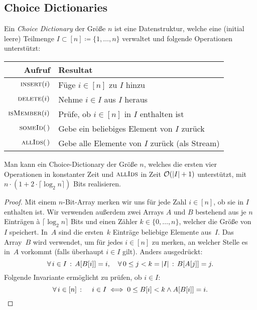 \documentclass{cheat-sheet}
\newcommand{\ceil}[1]{\lceil #1 \rceil} %
\renewcommand{\O}{\mathcal{O}} %
\begin{document}
\subsection{Choice Dictionaries}

\begin{defn}
  Ein \emph{Choice Dictionary} der Größe $n$ ist eine Datenstruktur, welche eine (initial leere) Teilmenge $I \subset [n] \coloneqq \{ 1, \ldots, n \}$ verwaltet und folgende Operationen unterstützt:
  
  \begin{tabular}{r l}
    Aufruf & Resultat \\[3pt] \hline
    $\Call{insert}{i}$ & Füge $i \in [n]$ zu $I$ hinzu \\
    $\Call{delete}{i}$ & Nehme $i \in I$ aus $I$ heraus \\
    $\Call{isMember}{i}$ & Prüfe, ob $i \in [n]$ in $I$ enthalten ist \\
    $\Call{someId}{\,}$ & Gebe ein beliebiges Element von $I$ zurück \\
    $\Call{allIds}{\,}$ & Gebe alle Elemente von $I$ zurück (als Stream)
  \end{tabular}
\end{defn}

\begin{lem}[CD\textsubscript{1}]
  Man kann ein Choice-Dictionary der Größe $n$, welches die ersten vier Operationen in konstanter Zeit und $\Call{allIds}{}$ in Zeit $\O(\abs{I} + 1)$ unterstützt, mit $n \cdot (1 + 2 \cdot \ceil{\log_2 n})$ Bits realisieren.
\end{lem}

\begin{proof}
  Mit einem $n$-Bit-Array merken wir uns für jede Zahl $i \in [n]$, ob sie in $I$ enthalten ist.
  Wir verwenden außerdem zwei Arrays $A$ und $B$ bestehend aus je $n$ Einträgen à $\ceil{\log_2 n}$ Bits und einen Zähler $k \in \{ 0, \ldots, n \}$, welcher die Größe von~$I$ speichert.
  In~$A$ sind die ersten~$k$ Einträge beliebige Elemente aus~$I$.
  Das Array~$B$ wird verwendet, um für jedes $i \in [n]$ zu merken, an welcher Stelle es in~$A$ vorkommt (falls überhaupt $i \in I$ gilt).
  Anders ausgedrückt:
  \[
    \forall \, {i \in I} \,:\, A[B[i]] = i, \quad
    \forall \, {0 \leq j < k = \lvert I\rvert} \,:\, B[A[j]] = j.
  \]
  Folgende Invariante ermöglicht zu prüfen, ob $i \in I$:
  \[
    \forall \, {i \in [n]} \,:\, \quad i \in I \iff 0 \leq B[i] < k \wedge A[B[i]] = i.
    \qedhere
  \]
\end{proof}
\end{document}
